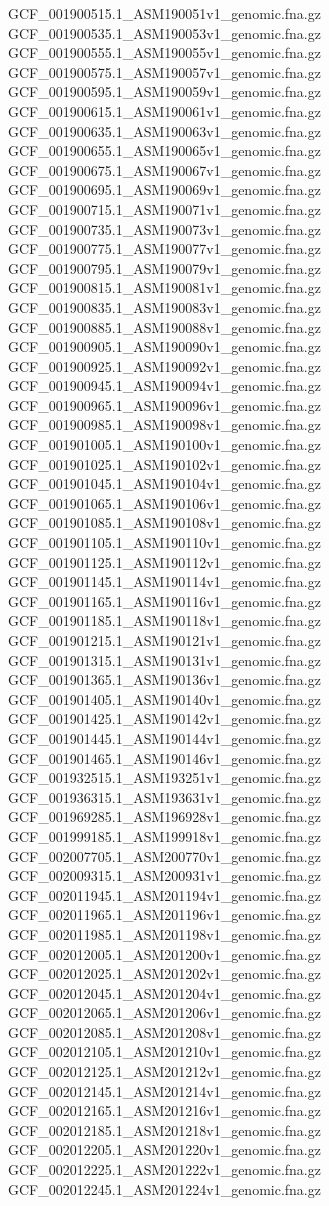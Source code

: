 \documentclass[12pt, letterpaper]{article}
\begin{document}
\begin{verbatim*}
GCF_001900515.1_ASM190051v1_genomic.fna.gz
GCF_001900535.1_ASM190053v1_genomic.fna.gz
GCF_001900555.1_ASM190055v1_genomic.fna.gz
GCF_001900575.1_ASM190057v1_genomic.fna.gz
GCF_001900595.1_ASM190059v1_genomic.fna.gz
GCF_001900615.1_ASM190061v1_genomic.fna.gz
GCF_001900635.1_ASM190063v1_genomic.fna.gz
GCF_001900655.1_ASM190065v1_genomic.fna.gz
GCF_001900675.1_ASM190067v1_genomic.fna.gz
GCF_001900695.1_ASM190069v1_genomic.fna.gz
GCF_001900715.1_ASM190071v1_genomic.fna.gz
GCF_001900735.1_ASM190073v1_genomic.fna.gz
GCF_001900775.1_ASM190077v1_genomic.fna.gz
GCF_001900795.1_ASM190079v1_genomic.fna.gz
GCF_001900815.1_ASM190081v1_genomic.fna.gz
GCF_001900835.1_ASM190083v1_genomic.fna.gz
GCF_001900885.1_ASM190088v1_genomic.fna.gz
GCF_001900905.1_ASM190090v1_genomic.fna.gz
GCF_001900925.1_ASM190092v1_genomic.fna.gz
GCF_001900945.1_ASM190094v1_genomic.fna.gz
GCF_001900965.1_ASM190096v1_genomic.fna.gz
GCF_001900985.1_ASM190098v1_genomic.fna.gz
GCF_001901005.1_ASM190100v1_genomic.fna.gz
GCF_001901025.1_ASM190102v1_genomic.fna.gz
GCF_001901045.1_ASM190104v1_genomic.fna.gz
GCF_001901065.1_ASM190106v1_genomic.fna.gz
GCF_001901085.1_ASM190108v1_genomic.fna.gz
GCF_001901105.1_ASM190110v1_genomic.fna.gz
GCF_001901125.1_ASM190112v1_genomic.fna.gz
GCF_001901145.1_ASM190114v1_genomic.fna.gz
GCF_001901165.1_ASM190116v1_genomic.fna.gz
GCF_001901185.1_ASM190118v1_genomic.fna.gz
GCF_001901215.1_ASM190121v1_genomic.fna.gz
GCF_001901315.1_ASM190131v1_genomic.fna.gz
GCF_001901365.1_ASM190136v1_genomic.fna.gz
GCF_001901405.1_ASM190140v1_genomic.fna.gz
GCF_001901425.1_ASM190142v1_genomic.fna.gz
GCF_001901445.1_ASM190144v1_genomic.fna.gz
GCF_001901465.1_ASM190146v1_genomic.fna.gz
GCF_001932515.1_ASM193251v1_genomic.fna.gz
GCF_001936315.1_ASM193631v1_genomic.fna.gz
GCF_001969285.1_ASM196928v1_genomic.fna.gz
GCF_001999185.1_ASM199918v1_genomic.fna.gz
GCF_002007705.1_ASM200770v1_genomic.fna.gz
GCF_002009315.1_ASM200931v1_genomic.fna.gz
GCF_002011945.1_ASM201194v1_genomic.fna.gz
GCF_002011965.1_ASM201196v1_genomic.fna.gz
GCF_002011985.1_ASM201198v1_genomic.fna.gz
GCF_002012005.1_ASM201200v1_genomic.fna.gz
GCF_002012025.1_ASM201202v1_genomic.fna.gz
GCF_002012045.1_ASM201204v1_genomic.fna.gz
GCF_002012065.1_ASM201206v1_genomic.fna.gz
GCF_002012085.1_ASM201208v1_genomic.fna.gz
GCF_002012105.1_ASM201210v1_genomic.fna.gz
GCF_002012125.1_ASM201212v1_genomic.fna.gz
GCF_002012145.1_ASM201214v1_genomic.fna.gz
GCF_002012165.1_ASM201216v1_genomic.fna.gz
GCF_002012185.1_ASM201218v1_genomic.fna.gz
GCF_002012205.1_ASM201220v1_genomic.fna.gz
GCF_002012225.1_ASM201222v1_genomic.fna.gz
GCF_002012245.1_ASM201224v1_genomic.fna.gz

\end{verbatim*}
\end{document}
